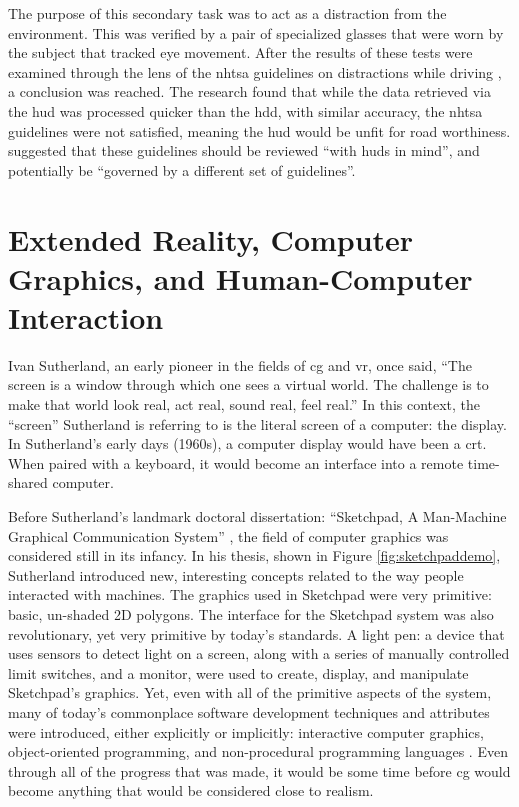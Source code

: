     \par The purpose of this secondary task was to act as a distraction from the environment. This was verified by a pair of specialized glasses that were worn by the subject that tracked eye movement. After the results of these tests were examined through the lens of the \gls{nhtsa} guidelines on distractions while driving \cite{NHTSA2013}, a conclusion was reached. The research found that while the data retrieved via the \gls{hud} was processed quicker than the \gls{hdd}, with similar accuracy, the \gls{nhtsa} guidelines were not satisfied, meaning the \gls{hud} would be unfit for road worthiness. \cite{Smith2016} suggested that these guidelines should be reviewed ``with \glspl{hud} in mind'', and potentially be ``governed by a different set of guidelines''.

\section{Extended Reality, Computer Graphics, and Human-Computer Interaction}
    \par Ivan Sutherland, an early pioneer in the fields of \gls{cg} and \gls{vr}, once said, ``The screen is a window through which one sees a virtual world. The challenge is to make that world look real, act real, sound real, feel real.'' \cite{Garassini1994} In this context, the ``screen'' Sutherland is referring to is the literal screen of a computer: the display. In Sutherland's early days (1960s), a computer display would have been a \gls{crt}. When paired with a keyboard, it would become an interface into a remote time-shared computer.

    \par Before Sutherland's landmark doctoral dissertation: ``Sketchpad, A Man-Machine Graphical Communication System'' \cite{Sutherland1963}, the field of computer graphics was considered still in its infancy. In his thesis, shown in Figure \ref{fig:sketchpaddemo}, Sutherland introduced new, interesting concepts related to the way people interacted with machines. The graphics used in Sketchpad were very primitive: basic, un-shaded 2D polygons. The interface for the Sketchpad system was also revolutionary, yet very primitive by today's standards. A light pen: a device that uses sensors to detect light on a screen, along with a series of manually controlled limit switches, and a monitor, were used to create, display, and manipulate Sketchpad's graphics. Yet, even with all of the primitive aspects of the system, many of today's commonplace software development techniques and attributes were introduced, either explicitly or implicitly: interactive computer graphics, object-oriented programming, and non-procedural programming languages \cite{Kay2017}. Even through all of the progress that was made, it would be some time before \gls{cg} would become anything that would be considered close to realism.

